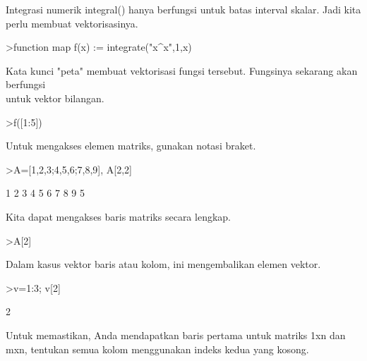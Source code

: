 \documentclass[a4paper,10pt]{article}
\begin{document}
\begin{eulernotebook}
\begin{eulercomment}
\begin{eulercomment}
\begin{eulercomment}
\begin{eulercomment}
\begin{eulercomment}
\begin{eulercomment}
\begin{eulercomment}
Integrasi numerik integral() hanya berfungsi untuk batas interval
skalar. Jadi kita perlu membuat vektorisasinya.
\end{eulercomment}
\begin{eulerprompt}
>function map f(x) := integrate("x^x",1,x)
\end{eulerprompt}
\begin{eulercomment}
Kata kunci "peta" membuat vektorisasi fungsi tersebut. Fungsinya
sekarang akan berfungsi\\
untuk vektor bilangan.
\end{eulercomment}
\begin{eulerprompt}
>f([1:5])
\end{eulerprompt}
\begin{euleroutput}
  [0,  2.05045,  13.7251,  113.336,  1241.03]
\end{euleroutput}
\begin{eulercomment}
Untuk mengakses elemen matriks, gunakan notasi braket.
\end{eulercomment}
\begin{eulerprompt}
>A=[1,2,3;4,5,6;7,8,9], A[2,2]
\end{eulerprompt}
\begin{euleroutput}
              1             2             3 
              4             5             6 
              7             8             9 
  5
\end{euleroutput}
\begin{eulercomment}
Kita dapat mengakses baris matriks secara lengkap.
\end{eulercomment}
\begin{eulerprompt}
>A[2]
\end{eulerprompt}
\begin{euleroutput}
  [4,  5,  6]
\end{euleroutput}
\begin{eulercomment}
Dalam kasus vektor baris atau kolom, ini mengembalikan elemen vektor.
\end{eulercomment}
\begin{eulerprompt}
>v=1:3; v[2]
\end{eulerprompt}
\begin{euleroutput}
  2
\end{euleroutput}
\begin{eulercomment}
Untuk memastikan, Anda mendapatkan baris pertama untuk matriks 1xn dan
mxn, tentukan semua kolom menggunakan indeks kedua yang kosong.
\end{eulercomment}

\end{eulercomment}
\end{eulercomment}
\end{eulercomment}
\end{eulercomment}
\end{eulercomment}
\end{eulercomment}
\end{eulernotebook}
\end{document}
